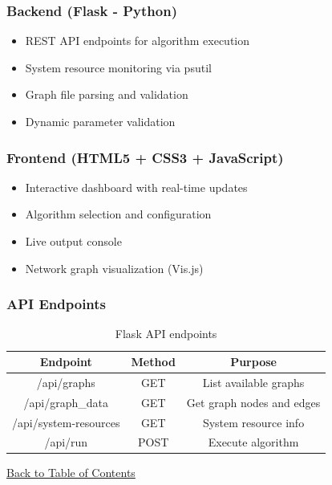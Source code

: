 \documentclass[12pt,a4paper]{article}
\begin{document}
\subsubsection{Backend (Flask - Python)}

\begin{itemize}
    \item REST API endpoints for algorithm execution
    \item System resource monitoring via psutil
    \item Graph file parsing and validation
    \item Dynamic parameter validation
\end{itemize}

\subsubsection{Frontend (HTML5 + CSS3 + JavaScript)}

\begin{itemize}
    \item Interactive dashboard with real-time updates
    \item Algorithm selection and configuration
    \item Live output console
    \item Network graph visualization (Vis.js)
\end{itemize}

\subsubsection{API Endpoints}

\begin{table}[H]
    \centering
    \begin{tabular}{|c|c|c|}
    \hline
    \textbf{Endpoint} & \textbf{Method} & \textbf{Purpose} \\
    \hline
    /api/graphs & GET & List available graphs \\
    /api/graph\_data & GET & Get graph nodes and edges \\
    /api/system-resources & GET & System resource info \\
    /api/run & POST & Execute algorithm \\
    \hline
    \end{tabular}
    \caption{Flask API endpoints}
    \label{tab:api_endpoints}
\end{table}

\hyperref[contents]{\small Back to Table of Contents}
\end{document}
